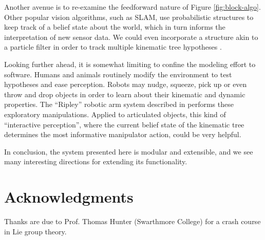 \documentclass[a4paper,orivec]{llncs}
\begin{document}
Another avenue is to re-examine the feedforward nature of Figure \ref{fig:block-algo}. Other popular vision algorithms, such as SLAM, use probabilistic structures to keep track of a belief state about the world, which in turn informs the interpretation of new sensor data. We could even incorporate a structure akin to a particle filter in order to track multiple kinematic tree hypotheses \cite{Thrun2002}.

Looking further ahead, it is somewhat limiting to confine the modeling effort to software. Humans and animals routinely modify the environment to test hypotheses and ease perception. Robots may nudge, squeeze, pick up or even throw and drop objects in order to learn about their kinematic and dynamic properties. The ``Ripley'' robotic arm system described in \cite{Hsiao2005} performs these exploratory manipulations. Applied to articulated objects, this kind of ``interactive perception'', where the current belief state of the kinematic tree determines the most informative manipulator action, could be very helpful.

In conclusion, the system presented here is modular and extensible, and we see many interesting directions for extending its functionality.


\section*{Acknowledgments}

Thanks are due to Prof. Thomas Hunter (Swarthmore College) for a crash course in Lie group theory.




\end{document}
